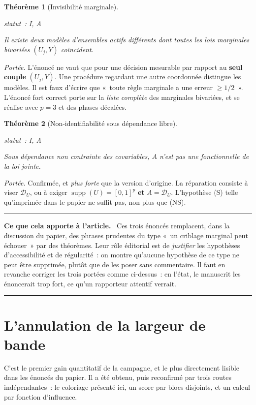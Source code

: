 \documentclass[11pt]{article}
\theoremstyle{plain}
\newtheorem{theoreme}{Théorème}[section]
\theoremstyle{definition}
\theoremstyle{remark}
\DeclareMathOperator{\supp}{supp}
\newcommand{\1}{\mathbf 1}
\newcommand{\D}{\mathcal D_U}
\newcommand{\statut}[1]{%
  \nopagebreak\par\nopagebreak
  \hfill{\normalfont\footnotesize\textcolor{gris}{statut~: #1}}%
  \par\nopagebreak\vspace{-2pt}}
\newenvironment{apport}
  {\par\medskip\noindent\begingroup\color{bleu}\rule{\linewidth}{0.6pt}\par
   \nobreak\vspace{2pt}\noindent\textbf{Ce que cela apporte à l'article.}\ \normalcolor}
  {\par\vspace{2pt}\noindent\textcolor{bleu}{\rule{\linewidth}{0.6pt}}\endgroup\par\medskip}
\begin{document}
\begin{theoreme}[Invisibilité marginale]
\label{thm:invisible}
\statut{I, A}
Il existe deux modèles d'ensembles actifs différents dont toutes les lois
marginales bivariées $(U_j,Y)$ coïncident.
\end{theoreme}

\noindent
\emph{Portée.} L'énoncé ne vaut que pour une décision mesurable par
rapport au \textbf{seul couple} $(U_j,Y)$. Une procédure regardant une
autre coordonnée distingue les modèles. Il est faux d'écrire que «~toute
règle marginale a une erreur $\ge1/2$~». L'énoncé fort correct porte sur
la \emph{liste complète} des marginales bivariées, et se réalise avec
$p=3$ et des phases décalées.

\begin{theoreme}[Non-identifiabilité sous dépendance libre]
\label{thm:nonid}
\statut{I, A}
Sous dépendance non contrainte des covariables, $A$ n'est pas une
fonctionnelle de la loi jointe.
\end{theoreme}

\noindent
\emph{Portée.} Confirmée, et \emph{plus forte} que la version d'origine.
La réparation consiste à viser $\D$, ou à exiger
$\supp(U)=[0,1]^p$ \textbf{et} $A=\D$. L'hypothèse (S) telle
qu'imprimée dans le papier ne suffit pas, non plus que (NS).

\begin{apport}
Ces trois énoncés remplacent, dans la discussion du papier, des phrases
prudentes du type «~un criblage marginal peut échouer~» par des théorèmes.
Leur rôle éditorial est de \emph{justifier} les hypothèses
d'accessibilité et de régularité~: on montre qu'aucune hypothèse de ce
type ne peut être supprimée, plutôt que de les poser sans commentaire.
Il faut en revanche corriger les trois portées comme ci-dessus~: en
l'état, le manuscrit les énoncerait trop fort, ce qu'un rapporteur
attentif verrait.
\end{apport}

\clearpage

\section{L'annulation de la largeur de bande}\label{ch:h}

C'est le premier gain quantitatif de la campagne, et le plus directement
lisible dans les énoncés du papier. Il a été obtenu, puis reconfirmé par
trois routes indépendantes~: le coloriage présenté ici, un score par blocs
disjoints, et un calcul par fonction d'influence.
\end{document}
